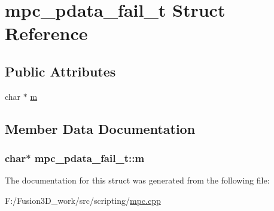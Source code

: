\hypertarget{structmpc__pdata__fail__t}{}\section{mpc\+\_\+pdata\+\_\+fail\+\_\+t Struct Reference}
\label{structmpc__pdata__fail__t}
\subsection*{Public Attributes}
\begin{DoxyCompactItemize}
\item 
char $\ast$ \hyperlink{structmpc__pdata__fail__t_aba79b912d1296263d6e9f1ef5907c3b0}{m}
\end{DoxyCompactItemize}


\subsection{Member Data Documentation}
\hypertarget{structmpc__pdata__fail__t_aba79b912d1296263d6e9f1ef5907c3b0}{}
\subsubsection[{m}]{\setlength{\rightskip}{0pt plus 5cm}char$\ast$ mpc\+\_\+pdata\+\_\+fail\+\_\+t\+::m}\label{structmpc__pdata__fail__t_aba79b912d1296263d6e9f1ef5907c3b0}


The documentation for this struct was generated from the following file\+:\begin{DoxyCompactItemize}
\item 
F\+:/\+Fusion3\+D\+\_\+work/src/scripting/\hyperlink{mpc_8cpp}{mpc.\+cpp}\end{DoxyCompactItemize}
